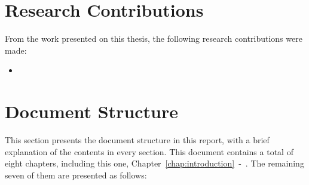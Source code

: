 \section{Research Contributions}
\label{sec:research_contributions}

From the work presented on this thesis, the following research contributions were made:

\begin{itemize}
    \item {}
\end{itemize}

\section{Document Structure}
\label{sec:document_structure}

This section presents the document structure in this report, with a brief explanation of the contents in every section. This document contains a total of eight chapters, including this one, Chapter~\ref{chap:introduction}~-~. The remaining seven of them are presented as follows:

